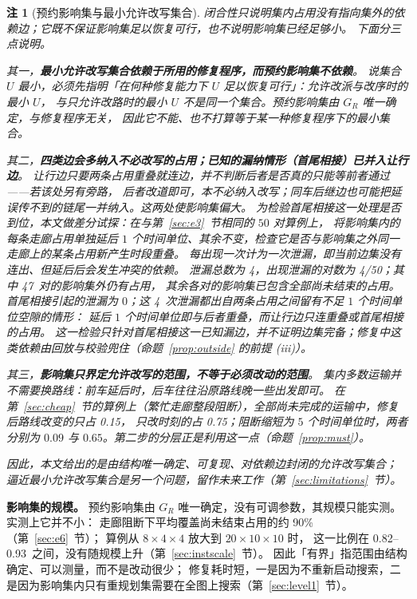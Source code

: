\documentclass[manuscript,screen,review]{acmart}
\newcommand{\NPairs}{50}
\newcommand{\ClosureAliveFrac}{90\%}
\newcommand{\ScaleJobsHi}{20}
\newcommand{\ScaleMachHi}{10}
\newcommand{\ScaleCloAliveLo}{0.82}  %
\newcommand{\ScaleCloAliveHi}{0.93}  %
\newcommand{\ProbeLeakPairs}{4/50}
\newcommand{\ProbeLeaks}{4}
\newcommand{\ProbeOutsidePairs}{47}  %
\newcommand{\WCRouteFrac}{0.15}          %
\newcommand{\WCTimeFrac}{0.75}           %
\newtheorem{remark}{注}
\begin{document}
\begin{remark}[预约影响集与最小允许改写集合]
\label{rem:minimality}
闭合性只说明集内占用没有指向集外的依赖边；它既不保证影响集足以恢复可行，也不说明影响集已经足够小。
下面分三点说明。

其一，\textbf{最小允许改写集合依赖于所用的修复程序，而预约影响集不依赖}。
说集合 \(U\) 最小，必须先指明「在何种修复能力下 \(U\) 足以恢复可行」：允许改派与改序时的最小 \(U\)，
与只允许改路时的最小 \(U\) 不是同一个集合。预约影响集由 \(G_R\) 唯一确定，与修复程序无关，
因此它不能、也不打算等于某一种修复程序下的最小集合。

其二，\textbf{四类边会多纳入不必改写的占用；已知的漏纳情形（首尾相接）已并入让行边}。
让行边只要两条占用重叠就连边，并不判断后者是否\emph{真的}只能等前者通过——若该处另有旁路，
后者改道即可，本不必纳入改写；同车后继边也可能把延误传不到的链尾一并纳入。这两处使影响集偏大。
为检验首尾相接这一处理是否到位，本文做\emph{差分试探}：在与第~\ref{sec:e3}~节相同的 \(\NPairs\) 对算例上，
将影响集内的每条走廊占用单独延后 \(1\) 个时间单位、其余不变，检查它是否与影响集之外同一走廊上的某条占用新产生时段重叠。
每出现一次计为一次泄漏，即当前边集没有连出、但延后后会发生冲突的依赖。
泄漏总数为 \ProbeLeaks，出现泄漏的对数为 \ProbeLeakPairs；其中 \ProbeOutsidePairs\ 对的影响集外仍有占用，
其余各对的影响集已包含全部尚未结束的占用。首尾相接引起的泄漏为 \(0\)；这 \ProbeLeaks\ 次泄漏都出自两条占用之间留有不足 \(1\) 个时间单位空隙的情形：
延后 \(1\) 个时间单位即与后者重叠，而让行边只连重叠或首尾相接的占用。
这一检验只针对首尾相接这一已知漏边，并不证明边集完备；修复中这类依赖由回放与校验兜住（命题~\ref{prop:outside} 的前提 (iii)）。

其三，\textbf{影响集只界定\emph{允许}改写的范围，不等于\emph{必须}改动的范围}。
集内多数运输并不需要换路线：前车延后时，后车往往沿原路线晚一些出发即可。
在第~\ref{sec:cheap}~节的算例上（繁忙走廊整段阻断），全部尚未完成的运输中，修复后路线改变的只占 \WCRouteFrac，
只改时刻的占 \WCTimeFrac；阻断缩短为 \(5\) 个时间单位时，两者分别为 \(0.09\) 与 \(0.65\)。第二步的分层正是利用这一点（命题~\ref{prop:must}）。

因此，本文给出的是由结构唯一确定、可复现、对依赖边封闭的允许改写集合；
逼近最小允许改写集合是另一个问题，留作未来工作（第~\ref{sec:limitations}~节）。
\end{remark}

\textbf{影响集的规模。}
\label{sec:structure}
预约影响集由 \(G_R\) 唯一确定，没有可调参数，其规模只能实测。实测上它并不小：
走廊阻断下平均覆盖尚未结束占用的约 \ClosureAliveFrac（第~\ref{sec:e6}~节）；
算例从 \(8\times4\times4\) 放大到 \(\ScaleJobsHi\times\ScaleMachHi\times\ScaleMachHi\) 时，
这一比例在 \ScaleCloAliveLo--\ScaleCloAliveHi\ 之间，没有随规模上升（第~\ref{sec:instscale}~节）。
因此「有界」指范围由结构确定、可以测量，而不是改动很少；
修复耗时短，一是因为不重新启动搜索，二是因为影响集内只有重规划集需要在全图上搜索（第~\ref{sec:level1}~节）。
\end{document}
